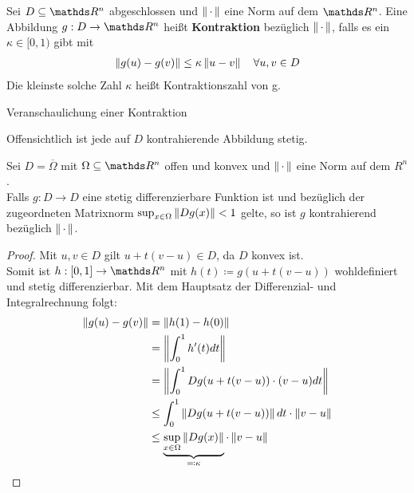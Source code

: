 \begin{Defe}
  Sei $D\subseteq  \R^n $ abgeschlossen und $\left\| \,\cdot\, \right\|$ eine Norm auf dem $\R^n$.
  Eine Abbildung $g:D\rightarrow \R^n $ heißt \textbf{Kontraktion} bezüglich  $\left\| \,\cdot\, \right\|$,
  falls es ein $\kappa \in [0,1)$ gibt mit
  \begin{gather*}
    \left\| g(u)-g(v) \right\| \leq \kappa \left\| u-v \right\| \quad \forall u,v\in D
  \end{gather*}
  Die kleinste solche Zahl $\kappa$ heißt Kontraktionszahl von g.
  
  \begin{image}{Veranschaulichung einer Kontraktion}
  \end{image}
  \label{im5.2.2}

  
  Offensichtlich ist jede auf $D$ kontrahierende Abbildung stetig.
\end{Defe}  

\begin{Leme}
  \label{5.2.3}
  Sei $D=\overline{\Omega} $ mit $\Omega \subseteq \R^n$ offen und konvex
  und $\left\| \,\cdot\, \right\|$ eine Norm auf dem $R^n$.\\
  Falls $g:D\to D$ eine stetig differenzierbare Funktion ist und
  bezüglich der zugeordneten Matrixnorm $\sup_{x\in \Omega}\left\| Dg(x) \right\|<1$ gelte,
  so ist $g$ kontrahierend bezüglich  $\left\| \,\cdot\, \right\|$.
\end{Leme} 

\begin{proof}
  Mit $u,v \in D$ gilt $u+t(v-u)\in D$, da $D$ konvex ist. \\
  Somit ist $h:[0,1]\rightarrow \R^n $ mit $h(t) \coloneqq g(u+t(v-u))$ wohldefiniert
  und stetig differenzierbar. Mit dem Hauptsatz der Differenzial- und Integralrechnung
  folgt:
  \begin{align}\nonumber
    \left\| g(u)-g(v) \right\| & = \left\| h(1)-h(0) \right\|  \\ \nonumber
                   & = \left\| \int_{0}^{1} h'(t) dt \right\| \\ \nonumber
                   & = \left\| \int_{0}^{1} Dg(u+t(v-u))\cdot (v-u)dt \right\| \\ \nonumber
                   & \leq \int_{0}^{1} \left\| Dg(u+t(v-u)) \right\|dt \cdot \left\| v-u \right\| \\
                   & \leq \underbrace{\sup_{x\in\Omega}\left\| Dg(x) \right\|}_{\eqqcolon \kappa} 
                     \cdot \left\| v-u \right\|
                     \label{V.2.4}
  \end{align}
\end{proof}


